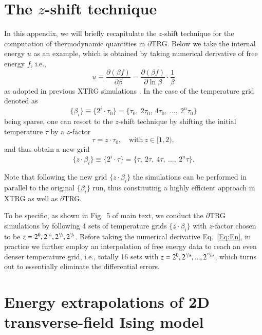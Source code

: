 \documentclass[aps,prx,twocolumn,showpacs,psfig,superscriptaddress,longbibliography]{revtex4-1}
\def\pd#1#2{\frac{\partial{#1}}{\partial{#2}}}
\newcommand{\Eq}[1]{Eq.~\eqref{#1}}
\def\dTRG{$\partial$TRG\xspace}
\begin{document}
\section{The $z$-shift technique}
\label{App:zshift}

In this appendix, we will briefly recapitulate the $z$-shift technique for the computation of thermodynamic quantities in \dTRG. Below we take the internal energy $u$ as an example, which is obtained by taking numerical derivative of free energy $f$, i.e., 
\begin{equation} \label{Eq:En}
u \equiv \pd{(\beta f)}{\beta} = \pd{(\beta f)}{\ln\beta}\cdot \frac{1}{\beta}
\end{equation}
as adopted in previous XTRG simulations \cite{Chen2018,Chen2019,Li2019}.
In the case of the temperature grid denoted as  
\begin{equation*}
\{\beta_i\} \equiv \{2^i\cdot\tau_0 \} = \{\tau_0, ~2\tau_0, ~4\tau_0, ~..., ~2^{n}\tau_0\}
\end{equation*}
being sparse, one can resort to the $z$-shift technique by shifting the initial temperature $\tau$ by a 
$z$-factor 
\begin{equation}
\tau = z \cdot \tau_0,\quad\mathrm{with}~z\in[1,2),
\end{equation}
and thus obtain a new grid 
\begin{equation*}
\{z\cdot\beta_i\} \equiv \{2^i\cdot\tau \} = \{\tau, ~2\tau, ~4\tau, ~..., ~2^{n}\tau\}.
\end{equation*}

Note that following the new grid $\{z\cdot\beta_i\}$ the simulations can be performed in parallel to the original $\{\beta_i\}$ run, thus constituting a highly efficient approach in XTRG \cite{Chen2018} as well as \dTRG. 

To be specific, as shown in Fig.~{\color{blue}5} of main text, we conduct the \dTRG simulations by following 4 sets of temperature grids $\{z\cdot\beta_i\}$ with $z$-factor chosen to be $z = 2^{0}, 2^{\sfrac{1}{4}}, 2^{\sfrac{1}{2}}, 2^{\sfrac{3}{4}}$. Before taking the numerical derivative \Eq{Eq:En}, in practice we further employ an interpolation of free energy data to reach an even denser temperature grid, i.e., totally 16 sets with $z = 2^0, 2^{\sfrac{1}{16}}, ..., 2^{\sfrac{15}{16}}$, which turns out to essentially eliminate the differential errors.

\section{Energy extrapolations of 2D transverse-field Ising model}
\label{App:extrap}
\end{document}
